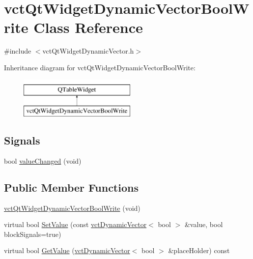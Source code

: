 \hypertarget{classvct_qt_widget_dynamic_vector_bool_write}{\section{vct\-Qt\-Widget\-Dynamic\-Vector\-Bool\-Write Class Reference}
\label{classvct_qt_widget_dynamic_vector_bool_write}
}


{\ttfamily \#include $<$vct\-Qt\-Widget\-Dynamic\-Vector.\-h$>$}

Inheritance diagram for vct\-Qt\-Widget\-Dynamic\-Vector\-Bool\-Write\-:\begin{figure}[H]
\begin{center}
\leavevmode
\includegraphics[height=2.000000cm]{d0/d2f/classvct_qt_widget_dynamic_vector_bool_write}
\end{center}
\end{figure}
\subsection*{Signals}
\begin{DoxyCompactItemize}
\item 
bool \hyperlink{classvct_qt_widget_dynamic_vector_bool_write_af221dadaa68c5f19f25f6260cc9b5706}{value\-Changed} (void)
\end{DoxyCompactItemize}
\subsection*{Public Member Functions}
\begin{DoxyCompactItemize}
\item 
\hyperlink{classvct_qt_widget_dynamic_vector_bool_write_a4159076c7371573adfc72f3fec154151}{vct\-Qt\-Widget\-Dynamic\-Vector\-Bool\-Write} (void)
\item 
virtual bool \hyperlink{classvct_qt_widget_dynamic_vector_bool_write_a624eb508d13b7b832256b8658c2a1618}{Set\-Value} (const \hyperlink{classvct_dynamic_vector}{vct\-Dynamic\-Vector}$<$ bool $>$ \&value, bool block\-Signals=true)
\item 
virtual bool \hyperlink{classvct_qt_widget_dynamic_vector_bool_write_ad0e2ef93bce6aa3dde4236e69727e3a2}{Get\-Value} (\hyperlink{classvct_dynamic_vector}{vct\-Dynamic\-Vector}$<$ bool $>$ \&place\-Holder) const 
\end{DoxyCompactItemize}
